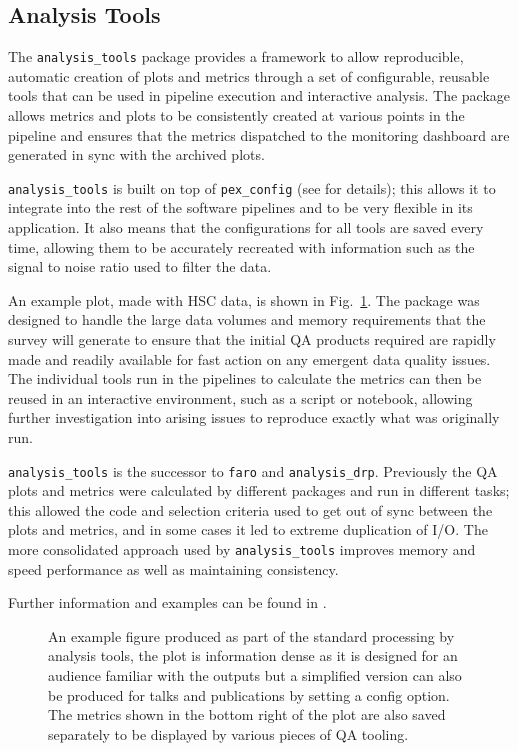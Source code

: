 \subsection{Analysis Tools}

The \texttt{analysis\_tools} package provides a framework to allow reproducible, automatic creation of plots and metrics through a set of configurable, reusable tools that can be used in pipeline execution and interactive analysis.
The package allows metrics and plots to be consistently created at various points in the pipeline and ensures that the metrics dispatched to the monitoring dashboard are generated in sync with the archived plots.

\texttt{analysis\_tools} is built on top of \texttt{pex\_config} (see  for details); this allows it to integrate into the rest of the software pipelines and to be very flexible in its application.
It also means that the configurations for all tools are saved every time, allowing them to be accurately recreated with information such as the signal to noise ratio used to filter the data.

An example plot, made with HSC data, is shown in Fig.~\ref{fig:atools}.
The package was designed to handle the large data volumes and memory requirements that the survey will generate to ensure that the initial QA products required are rapidly made and readily available for fast action on any emergent data quality issues.
The individual tools run in the pipelines to calculate the metrics can then be reused in an interactive environment, such as a script or notebook, allowing further investigation into arising issues to reproduce exactly what was originally run.

\texttt{analysis\_tools} is the successor to \texttt{faro} \citep{2022SPIE12189E..0MG} and \texttt{analysis\_drp}.
Previously the QA plots and metrics were calculated by different packages and run in different tasks; this allowed the code and selection criteria used to get out of sync between the plots and metrics, and in some cases it led to extreme duplication of I/O.
The more consolidated approach used by \texttt{analysis\_tools} improves memory and speed performance as well as maintaining consistency.

Further information and examples can be found in \citet{DMTN-314}.

\begin{figure}[h]
\caption{An example figure produced as part of the standard processing by analysis tools, the plot is information dense as it is designed for an audience familiar with the outputs but a simplified version can also be produced for talks and publications by setting a config option.
The metrics shown in the bottom right of the plot are also saved separately to be displayed by various pieces of QA tooling.}
\label{fig:atools}
\end{figure}
